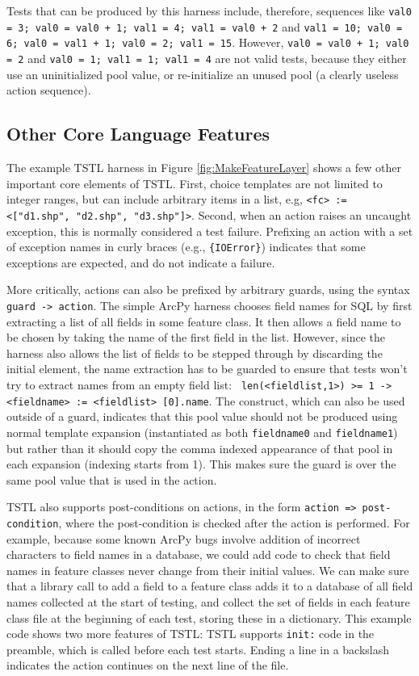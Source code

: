 Tests that can be produced by this harness include, therefore,
sequences like  {\tt val0 = 3; val0 = val0 + 1; val1 = 4; val1 = val0
  + 2} and {\tt val1 = 10; val0 = 6; val0 = val1 + 1; val0 = 2; val1 =
  15}.  However, {\tt val0 = val0 + 1; val0 = 2} and
{\tt val0 = 1; val1 = 1; val1 = 4} are not valid tests, because they
either use an uninitialized pool value, or re-initialize an unused
pool (a clearly useless action sequence).

\subsection{Other Core Language Features}

The example TSTL harness in Figure \ref{fig:MakeFeatureLayer} shows a
few other important core elements of TSTL.  First, choice templates
are not limited to integer ranges, but can include arbitrary items in
a list, e.g, {\tt <fc> := <["d1.shp", "d2.shp", "d3.shp"]>}.
Second, when an action raises an uncaught exception, this is normally
considered a test failure.  Prefixing an action with a set of
exception names in curly braces (e.g., {\tt \{IOError\}}) indicates
that some exceptions are expected, and do not indicate a failure.

More critically, actions can also be prefixed by arbitrary guards, using
the syntax {\tt guard -> action}.  The simple ArcPy harness chooses
field names for SQL by first extracting a list of all fields in some
feature class.  It then allows a field name to be chosen by taking the
name of the first field in the list.  However, since the harness also
allows the list of fields to be stepped through by discarding the
initial element, the name extraction has to be guarded to ensure that
tests won't try to extract names from an empty field list:  {\tt
  len(<fieldlist,1>) >= 1 -> <fieldname> := <fieldlist> [0].name}.
The {\tt <fieldlist,1>} construct, which can also be used outside of a
guard, indicates that this pool value should not be produced using
normal template expansion (instantiated as both {\tt fieldname0} and
{\tt fieldname1}) but rather than it should copy the comma indexed
appearance of that pool in each expansion (indexing starts from 1).  This makes sure the guard
is over the same pool value that is used in the action.

TSTL also supports post-conditions on actions, in the form {\tt action
  => post-condition}, where the post-condition is checked after the
action is performed.  For example, because some known ArcPy bugs
involve addition of incorrect characters to field names in a database,
we could add code to check that field names in feature classes never
change from their initial values.  We can make sure that a library
call to add a field to a feature class adds it to a database of all
field names collected at the start of testing, and collect the set of
fields in each feature class file at the beginning of each test,
storing these in a dictionary.  This example code shows two more
features of TSTL: TSTL supports {\tt init:} code in the preamble,
which is called before each test starts.  Ending a line in a backslash
indicates the action continues on the next line of the file.

